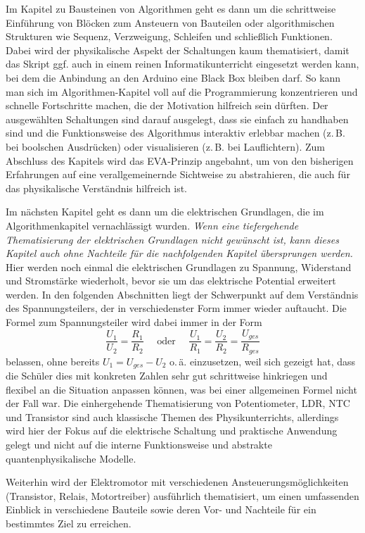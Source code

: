 Im Kapitel zu Bausteinen von Algorithmen geht es dann um die schrittweise Einführung von Blöcken zum Ansteuern von Bauteilen oder algorithmischen Strukturen wie Sequenz, Verzweigung, Schleifen und schließlich Funktionen. Dabei wird der physikalische Aspekt der Schaltungen kaum thematisiert, damit das Skript ggf. auch in einem reinen Informatikunterricht eingesetzt werden kann, bei dem die Anbindung an den Arduino eine Black Box bleiben darf. So kann man sich im Algorithmen-Kapitel voll auf die Programmierung konzentrieren und schnelle Fortschritte machen, die der Motivation hilfreich sein dürften. Der ausgewählten Schaltungen sind darauf ausgelegt, dass sie einfach zu handhaben sind und die Funktionsweise des Algorithmus interaktiv erlebbar machen (z.\,B. bei boolschen Ausdrücken) oder visualisieren (z.\,B. bei Lauflichtern). Zum Abschluss des Kapitels wird das EVA-Prinzip angebahnt, um von den bisherigen Erfahrungen auf eine verallgemeinernde Sichtweise zu abstrahieren, die auch für das physikalische Verständnis hilfreich ist.

Im nächsten Kapitel geht es dann um die elektrischen Grundlagen, die im Algorithmenkapitel vernachlässigt wurden. \emph{Wenn eine tiefergehende Thematisierung der elektrischen Grundlagen nicht gewünscht ist, kann dieses Kapitel auch ohne Nachteile für die nachfolgenden Kapitel übersprungen werden.} Hier werden noch einmal die elektrischen Grundlagen zu Spannung, Widerstand und Stromstärke wiederholt, bevor sie um das elektrische Potential erweitert werden. In den folgenden Abschnitten liegt der Schwerpunkt auf dem Verständnis des Spannungsteilers, der in verschiedenster Form immer wieder auftaucht. Die Formel zum Spannungsteiler wird dabei immer in der Form
\begin{equation*}
\frac{U_1}{U_2} = \frac{R_1}{R_2} \quad \text{ oder } \quad \frac{U_1}{R_1} = \frac{U_2}{R_2} = \frac{U_{ges}}{R_{ges}}
\end{equation*}
belassen, ohne bereits $U_1 = U_{ges} - U_2$ o.\,ä. einzusetzen, weil sich gezeigt hat, dass die Schüler dies mit konkreten Zahlen sehr gut schrittweise hinkriegen und flexibel an die Situation anpassen können, was bei einer allgemeinen Formel nicht der Fall war. Die einhergehende Thematisierung von Potentiometer, LDR, NTC und Transistor sind auch klassische Themen des Physikunterrichts, allerdings wird hier der Fokus auf die elektrische Schaltung und praktische Anwendung gelegt und nicht auf die interne Funktionsweise und abstrakte quantenphysikalische Modelle.

Weiterhin wird der Elektromotor mit verschiedenen Ansteuerungsmöglichkeiten (Transistor, Relais, Motortreiber) ausführlich thematisiert, um einen umfassenden Einblick in verschiedene Bauteile sowie deren Vor- und Nachteile für ein bestimmtes Ziel zu erreichen.

